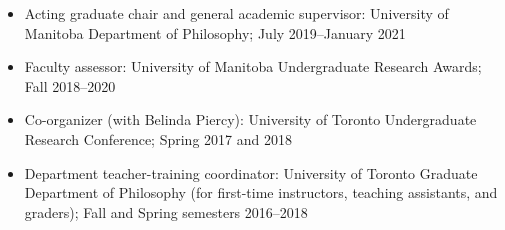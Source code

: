 \documentclass[12pt]{article}
\begin{document}
\begin{itemize}

\item[] Acting graduate chair and general academic supervisor: University of
Manitoba Department of Philosophy; July 2019--January 2021

\item[] Faculty assessor: University of Manitoba Undergraduate Research
Awards; Fall 
2018--2020

\item[] Co-organizer (with Belinda Piercy): University of Toronto Undergraduate
Research Conference; Spring 2017 and 2018

\item[] Department teacher-training coordinator: University of Toronto
Graduate Department of Philosophy (for first-time instructors, teaching
assistants, and graders); Fall and Spring semesters 2016--2018

\end{itemize}
\end{document}
